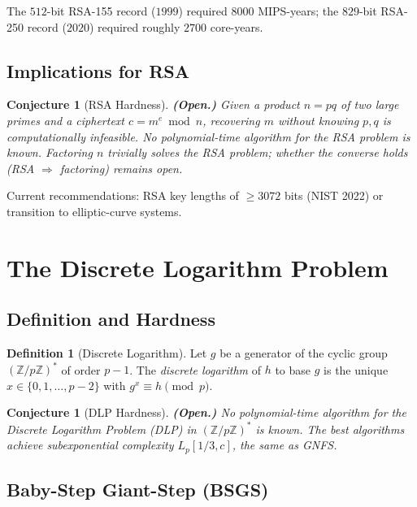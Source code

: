 \documentclass[12pt,a4paper]{amsart}
\newtheorem{conjecture}[theorem]{Conjecture}
\theoremstyle{definition}
\newtheorem{definition}[theorem]{Definition}
\begin{document}
The $512$-bit RSA-155 record ($1999$) required $8000$ MIPS-years; the
$829$-bit RSA-250 record ($2020$) required roughly $2700$ core-years.

\subsection{Implications for RSA}

\begin{conjecture}[RSA Hardness]
\textbf{(Open.)} Given a product $n = pq$ of two large primes and a ciphertext
$c = m^e \bmod n$, recovering $m$ without knowing $p,q$ is computationally
infeasible. No polynomial-time algorithm for the RSA problem is known. Factoring $n$ trivially solves the RSA problem;
whether the converse holds (RSA $\Rightarrow$ factoring) remains open.
\end{conjecture}

Current recommendations: RSA key lengths of $\ge 3072$ bits (NIST 2022)
or transition to elliptic-curve systems.

\section{The Discrete Logarithm Problem}

\subsection{Definition and Hardness}

\begin{definition}[Discrete Logarithm]
Let $g$ be a generator of the cyclic group $(\mathbb{Z}/p\mathbb{Z})^*$ of
order $p-1$. The \emph{discrete logarithm} of $h$ to base $g$ is the unique
$x \in \{0, 1, \ldots, p-2\}$ with $g^x \equiv h \pmod{p}$.
\end{definition}

\begin{conjecture}[DLP Hardness]
\textbf{(Open.)} No polynomial-time algorithm for the Discrete Logarithm
Problem (DLP) in $(\mathbb{Z}/p\mathbb{Z})^*$ is known. The best algorithms
achieve subexponential complexity $L_p[1/3, c]$, the same as GNFS.
\end{conjecture}

\subsection{Baby-Step Giant-Step (BSGS)}
\end{document}

